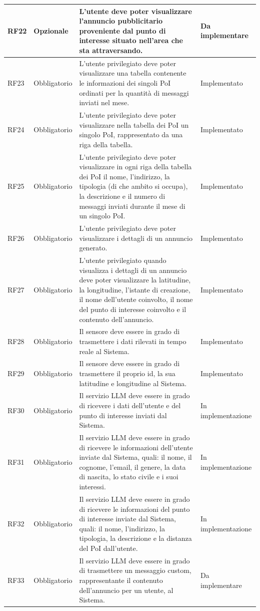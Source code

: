 \documentclass[10pt]{article}
\begin{document}
\begin{longtable}{|>{\centering\arraybackslash}m{2.7cm}|>{\centering\arraybackslash}m{2.7cm}|>{\raggedright\arraybackslash}m{6cm}|>{\centering\arraybackslash}m{2.1cm}|}
    \hline
    RF22 & Opzionale & L'utente deve poter visualizzare l'annuncio pubblicitario proveniente dal punto di interesse situato nell'area che sta attraversando. & Da implementare \\
    \hline
    RF23 & Obbligatorio & L'utente privilegiato deve poter visualizzare una tabella contenente le informazioni dei singoli PoI ordinati per la quantità di messaggi inviati nel mese. & Implementato \\
    \hline
    RF24 & Obbligatorio & L'utente privilegiato deve poter visualizzare nella tabella dei PoI un singolo PoI, rappresentato da una riga della tabella. & Implementato \\
    \hline
    RF25 & Obbligatorio & L'utente privilegiato deve poter visualizzare in ogni riga della tabella dei PoI il nome, l'indirizzo, la tipologia (di che ambito si occupa), la descrizione e il numero di messaggi inviati durante il mese di un singolo PoI. & Implementato \\
    \hline
    RF26 & Obbligatorio & L'utente privilegiato deve poter visualizzare i dettagli di un annuncio generato. & Implementato \\
    \hline
    RF27 & Obbligatorio & L'utente privilegiato quando visualizza i dettagli di un annuncio deve poter visualizzare la latitudine, la longitudine, l'istante di creazione, il nome dell'utente coinvolto, il nome del punto di interesse coinvolto e il contenuto dell'annuncio. & Implementato \\
    \hline
    RF28 & Obbligatorio & Il sensore deve essere in grado di trasmettere i dati rilevati in tempo reale al Sistema. & Implementato \\
    \hline
    RF29 & Obbligatorio & Il sensore deve essere in grado di trasmettere il proprio id, la sua latitudine e longitudine al Sistema. & Implementato \\
    \hline
    RF30 & Obbligatorio & Il servizio LLM deve essere in grado di ricevere i dati dell'utente e del punto di interesse inviati dal Sistema. & In implementazione \\
    \hline
    RF31 & Obbligatorio & Il servizio LLM deve essere in grado di ricevere le informazioni dell'utente inviate dal Sistema, quali: il nome, il cognome, l'email, il genere, la data di nascita, lo stato civile e i suoi interessi. & In implementazione \\
    \hline
    RF32 & Obbligatorio & Il servizio LLM deve essere in grado di ricevere le informazioni del punto di interesse inviate dal Sistema, quali: il nome, l'indirizzo, la tipologia, la descrizione e la distanza del PoI dall'utente. & In implementazione \\
    \hline
    RF33 & Obbligatorio & Il servizio LLM deve essere in grado di trasmettere un messaggio custom, rappresentante il contenuto dell'annuncio per un utente, al Sistema. & Da implementare \\
    \hline
\end{longtable}
\end{document}
